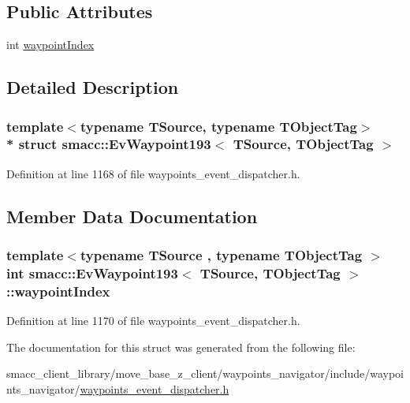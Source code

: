 \subsection*{Public Attributes}
\begin{DoxyCompactItemize}
\item 
int \hyperlink{structsmacc_1_1EvWaypoint193_a93cdd6307f78b131a070cd5d3274216a}{waypoint\+Index}
\end{DoxyCompactItemize}


\subsection{Detailed Description}
\subsubsection*{template$<$typename T\+Source, typename T\+Object\+Tag$>$\\*
struct smacc\+::\+Ev\+Waypoint193$<$ T\+Source, T\+Object\+Tag $>$}



Definition at line 1168 of file waypoints\+\_\+event\+\_\+dispatcher.\+h.



\subsection{Member Data Documentation}
\subsubsection[{\texorpdfstring{waypoint\+Index}{waypointIndex}}]{\setlength{\rightskip}{0pt plus 5cm}template$<$typename T\+Source , typename T\+Object\+Tag $>$ int {\bf smacc\+::\+Ev\+Waypoint193}$<$ T\+Source, T\+Object\+Tag $>$\+::waypoint\+Index}\hypertarget{structsmacc_1_1EvWaypoint193_a93cdd6307f78b131a070cd5d3274216a}{}\label{structsmacc_1_1EvWaypoint193_a93cdd6307f78b131a070cd5d3274216a}


Definition at line 1170 of file waypoints\+\_\+event\+\_\+dispatcher.\+h.



The documentation for this struct was generated from the following file\+:\begin{DoxyCompactItemize}
\item 
smacc\+\_\+client\+\_\+library/move\+\_\+base\+\_\+z\+\_\+client/waypoints\+\_\+navigator/include/waypoints\+\_\+navigator/\hyperlink{waypoints__event__dispatcher_8h}{waypoints\+\_\+event\+\_\+dispatcher.\+h}\end{DoxyCompactItemize}
